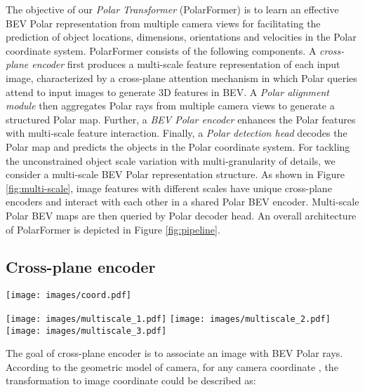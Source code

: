 \documentclass[letterpaper]{article} \usepackage{aaai23}  \usepackage{times}  \usepackage{helvet}  \usepackage{courier}  \usepackage[hyphens]{url}  \usepackage{graphicx} \urlstyle{rm} \def\UrlFont{\rm}  \usepackage{natbib}  \usepackage{caption} \frenchspacing  \setlength{\pdfpagewidth}{8.5in} \setlength{\pdfpageheight}{11in} \usepackage{algorithm}
\begin{document}
The objective of our {\em Polar Transformer} (PolarFormer) is to learn an effective 
BEV Polar representation 
from multiple camera views for facilitating the prediction of object locations, dimensions, orientations and velocities in the Polar coordinate system.
PolarFormer consists of the following components.
A {\em cross-plane encoder} first
produces a multi-scale feature representation of
each input image, characterized by a cross-plane attention mechanism in which Polar queries attend to input images to generate 3D features in BEV. 
A {\em Polar alignment module} then aggregates Polar rays from multiple camera views to generate a structured Polar map. Further, a {\em BEV Polar encoder} enhances the Polar features with multi-scale feature interaction. Finally, a {\em Polar detection head} decodes the Polar map and predicts the objects in the Polar coordinate system. 
For tackling the unconstrained object scale variation with multi-granularity of details,
we consider a multi-scale BEV Polar representation structure. 
As shown in Figure \ref{fig:multi-scale}, image features with different scales have unique cross-plane encoders
and interact with each other in a shared Polar BEV encoder. 
Multi-scale Polar BEV maps are then queried by Polar decoder head.
An overall architecture of PolarFormer is depicted in Figure \ref{fig:pipeline}.

\subsection{Cross-plane encoder}
\begin{figure*}[t]
\centering
\begin{minipage}[t]{0.445\textwidth}
\centering
\texttt{[image: images/coord.pdf]}
\caption{Cartesian and Polar coordinates.}
\label{fig:learning_targets}
\end{minipage}
\begin{minipage}[t]{0.545\textwidth}
\centering
\texttt{[image: images/multiscale\_1.pdf]}
\hspace{-0.75cm}
\texttt{[image: images/multiscale\_2.pdf]} 
\hspace{-0.15cm}
\texttt{[image: images/multiscale\_3.pdf]}
\caption{Multi-scale Polar BEV maps.}
\label{fig:multi-scale}
\end{minipage}
\end{figure*}
 The goal of cross-plane encoder is to associate an image with BEV Polar rays. According to the geometric model of camera, for any camera coordinate , the transformation to image coordinate could be described as:
\end{document}
